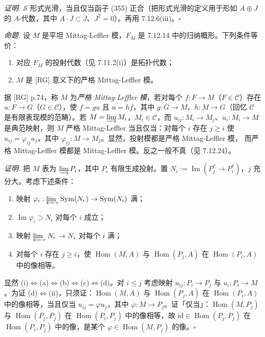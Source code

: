 \emph{证明.} $\mathcal{S}$ 形式光滑，当且仅当函子 (355) 正合（把形式光滑的定义用于形如 $A\oplus J$ 的 $A$-代数，其中 $A\cdot J\subset J$、$J^2=0$）。再用 7.12.6(iii)。\hfill$\square$

 \emph{命题.} 设 $M$ 是平坦 Mittag-Leffler 模，$F_M$ 是 7.12.14 中的归纳概形。下列条件等价：
\begin{enumerate}[label=(\roman*),leftmargin=2.2em]
\item 对应 $F_M$ 的投射代数（见 7.11.2(i)）是拓扑代数；
\item $M$ 是 [RG] 意义下的严格 Mittag-Leffler 模。
\end{enumerate}

据 [RG] p.74，称 $M$ 为\emph{严格 Mittag-Leffler 模}，若对每个 $f:F\to M$（$F\in\mathcal{C}$）存在 $u:F\to G$（$G\in\mathcal{C}$），使 $f=gu$ 且 $u=hf$，其中 $g:G\to M$、$h:M\to G$（回忆 $\mathcal{C}$ 是有限表现模的范畴）。若 $M=\varinjlim M_i$，$M_i\in\mathcal{C}$，而 $u_{ij}:M_i\to M_j$、$u_i:M_i\to M$ 是典范映射，则 $M$ 严格 Mittag-Leffler 当且仅当：对每个 $i$ 存在 $j\ge i$ 使 $u_{ij}=\varphi_{ij}u_j$，其中 $\varphi_{ij}:M\to M_j$。显然，投射模都是严格 Mittag-Leffler 模，%
%
而严格 Mittag-Leffler 模都是 Mittag-Leffler 模。反之一般不真（见 7.12.24）。

\emph{证明.} 把 $M$ 表为 $\varinjlim P_i$，其中 $P_i$ 有限生成投射。置 $N_i:=\operatorname{Im}(P^{*}_j\to P^{*}_i)$，$j$ 充分大。考虑下述条件：
\begin{enumerate}[label=(\alph*),leftmargin=2.2em]
\item 映射 $\varphi_i:\varprojlim_r\operatorname{Sym}(N_r)\to\operatorname{Sym}(N_i)$ 满；
\item $\operatorname{Im}\varphi_i\supset N_i$ 对每个 $i$ 成立；
\item 映射 $\varprojlim_r N_r\to N_i$ 对每个 $i$ 满；
\item 对每个 $i$ 存在 $j\ge i$，使 $\operatorname{Hom}(M,A)$ 与 $\operatorname{Hom}(P_j,A)$ 在 $\operatorname{Hom}(P_i,A)$ 中的像相等。
\end{enumerate}
显然 (i)$\Leftrightarrow$(a)$\Leftrightarrow$(b)$\Leftrightarrow$(c)$\Leftrightarrow$(d)。对 $i\le j$ 考虑映射 $u_{ij}:P_i\to P_j$ 与 $u_i:P_i\to M$。为证 (d)$\Leftrightarrow$(ii)，只须证：$\operatorname{Hom}(M,A)$ 与 $\operatorname{Hom}(P_j,A)$ 在 $\operatorname{Hom}(P_i,A)$ 中的像相等，当且仅当 $u_{ij}=\varphi u_j$，其中 $\varphi:M\to P_j$。证「仅当」：$\operatorname{Hom}(M,P_j)$ 与 $\operatorname{Hom}(P_j,P_j)$ 在 $\operatorname{Hom}(P_i,P_j)$ 中的像相等，故 $\mathrm{id}\in\operatorname{Hom}(P_j,P_j)$ 在 $\operatorname{Hom}(P_i,P_j)$ 中的像，是某个 $\varphi\in\operatorname{Hom}(M,P_j)$ 的像。\hfill$\square$

